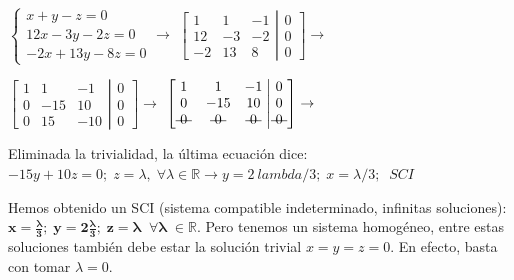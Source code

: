 \begin{ejem}
$\begin{cases}x+y-z=0\\12x-3y-2z=0\\-2x+13y-8z=0\end{cases} \to$
$\left[ \begin{matrix}
  1 & 1 & -1 \\ 12 & -3 & -2 \\ -2 & 13 & 8 
 \end{matrix}\right. 
 \left| \begin{matrix}
  0 \\ 0 \\ 0 
 \end{matrix}\right] \to $	
 
 
 $\left[ \begin{matrix}
  1 & 1 & -1 \\ 0 & -15 & 10 \\ 0 & 15 & -10 
 \end{matrix}\right. 
 \left| \begin{matrix}
  0 \\ 0 \\ 0 
 \end{matrix}\right] \to $
 $\left[ \begin{matrix}
  1 & 1 & -1 \\ 0 & -15 & 10 \\ \text{\textst{ 0 }}  & \text{\textst{ 0 }}  & \text{\textst{ 0 }}  
 \end{matrix}\right. 
 \left| \begin{matrix}
  0 \\ 0 \\ \text{\textst{ 0 }}  
 \end{matrix}\right] \to $
 
 Eliminada la trivialidad, la última ecuación dice: $-15y+10z=0; \; z=\lambda, \; \forall \lambda \in \mathbb R \to y=2\	lambda /3; \; x=\lambda /3; \; \; SCI$
 
 Hemos obtenido un SCI (sistema compatible indeterminado, infinitas soluciones): $\boldsymbol{x=\frac {\lambda} 3; \; y=2 \frac {\lambda} 3; \; z= \lambda \; \; \forall \lambda \; \in \mathbb R}$. Pero tenemos un sistema homogéneo, entre estas soluciones también debe estar la solución trivial $x=y=z=0$. En efecto, basta con tomar $\lambda=0$.
\end{ejem}


